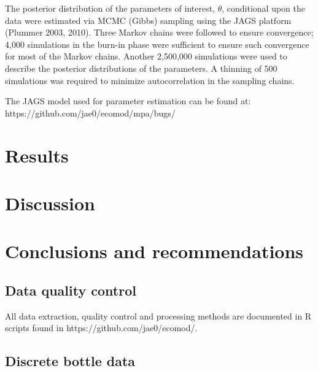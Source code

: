 \documentclass[letterpaper,portrait,11pt]{scrartcl}
\numberwithin{equation}{section}		%
\numberwithin{figure}{section}			%
\numberwithin{table}{section}				%
\begin{document}
\begin{itemize*}
The posterior distribution of the parameters of interest, $\theta$, conditional upon the data were estimated via MCMC (Gibbs) sampling using the JAGS platform (Plummer 2003, 2010). Three Markov chains were followed to ensure convergence; 4,000 simulations in the burn-in phase were sufficient to ensure such convergence for most of the Markov chains. Another 2,500,000 simulations were used to describe the posterior distributions of the parameters. A thinning of 500 simulations was required to minimize autocorrelation in the sampling chains.

The JAGS model used for parameter estimation can be found at: \\

https://github.com/jae0/ecomod/mpa/bugs/




\section{Results}

\section{Discussion}

\section{Conclusions and recommendations}




\clearpage

%
%



\clearpage \newpage


\begin{appendices}
  
\section{Data quality control}

All data extraction, quality control and processing methods are documented in R scripts found in https://github.com/jae0/ecomod/.

\subsection{Discrete bottle data}


\end{appendices}
\end{itemize*}
\end{document}
